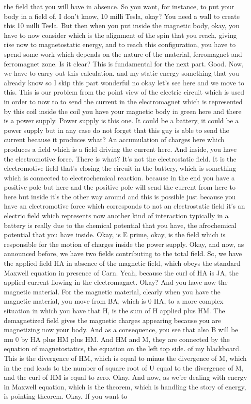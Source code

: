 the field that you will have in absence. So you want, for instance, to put your body in a field of, I don't know, 10 milli Tesla, okay? You need a wall to create this 10 milli Tesla. But then when you put inside the magnetic body, okay, you have to now consider which is the alignment of the spin that you reach, giving rise now to magnetostatic energy, and to reach this configuration, you have to spend some work which depends on the nature of the material, ferromagnet and ferromagnet zone. Is it clear? This is fundamental for the next part. Good. Now, we have to carry out this calculation. and my static energy something that you already know so I skip this part wonderful no okay let's see here and we move to this.
This is our problem from the point view of the electric circuit which is used in order to now to to send the current in the electromagnet which is represented by this coil inside the coil you have your magnetic body in green here and there is a power supply. Power supply is this one. It could be a battery, it could be a power supply but in any case do not forget that this guy is able to send the current because it produces what? An accumulation of charges here which produces a field which is a field driving the current here. And inside, you have the electromotive force. There is what? It's not the electrostatic field. It is the electromotive field that's closing the circuit in the battery, which is something which is connected to electrochemical reaction. because in the end you have a positive pole but here and the positive pole will send the current from here to here but inside it's the other way around and this is possible just because you have an electromotive force which corresponds to not an electrostatic field it's an electric field which represents now another kind of interaction typically in a battery is really due to the chemical potential that you have, the afrochemical potential that you have inside. Okay, is E prime, okay, is the field which is responsible for the motion of charges inside the power supply. Okay, and now, as announced before, we have two fields contributing to the total field. So, we have the applied field HA in absence of the magnetic field, which obeys the standard Maxwell equation in presence of Carn. Yeah, because the curl of HA is JA, the applied current flowing in the electromagnet. Okay? And you have now the magnetic material. For the magnetic material, clearly when you have the magnetic material, you move from BA, which is 0 HA, to a more complex situation in which you have that H, is the sum of H applied plus HM. The demagnetized field gives the magnetic charges appearing because you are magnetizing now your body. And as a consequence, you see that also B will be mu 0 by HA plus HM plus HM. And HM and M, they are connected by the equation of magnetostatics, the equation on the left top side. of my blackboard. This is the divergence of HM, which is equal to minus the divergence of M, which in the end leads to the number of square root of U equal to the divergence of M, and the curl of HM is equal to zero. Okay. And now, as we're dealing with energy in Maxwell equation, which is the theorem, which is handling the story of energy, is pointing theorem. Okay. If you want to 